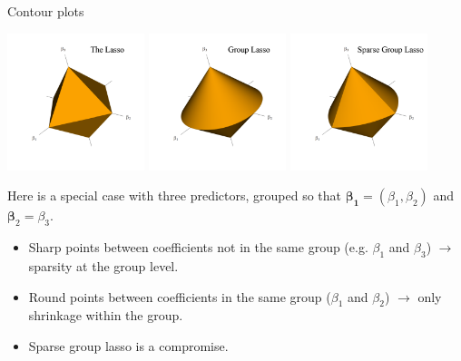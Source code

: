 \documentclass[8pt]{beamer}
\begin{document}
\begin{frame}{Contour plots}

\begin{center}
    \includegraphics[width = 0.3\textwidth]{3D_cont_lasso.pdf}
    \includegraphics[width = 0.3\textwidth]{3D_cont_glasso.pdf}
    \includegraphics[width = 0.3\textwidth]{3D_cont_sglasso.pdf}
\end{center}

Here is a special case with three predictors, grouped so that $\bm{\beta_1} = (\beta_1, \beta_2)$ and $\bm{\beta}_2 = \beta_3$.
\begin{itemize}
    \item Sharp points between coefficients not in the same group (e.g. $\beta_1$ and $\beta_3$) $\to$ sparsity at the group level.
    \item Round points between coefficients in the same group ($\beta_1$ and $\beta_2$) $\to$ only shrinkage within the group.
    \item Sparse group lasso is a compromise.
\end{itemize}
    
\end{frame}
\end{document}
